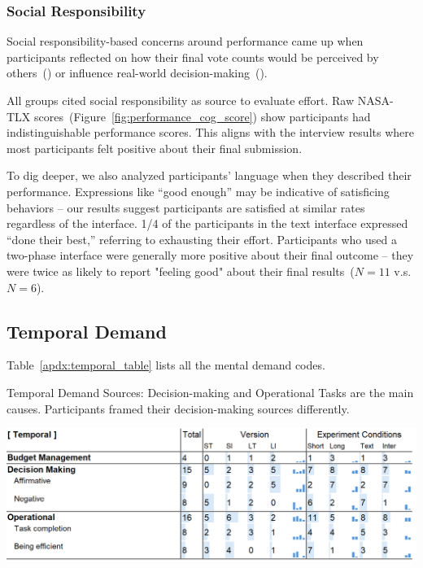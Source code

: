 \subsubsection{Social Responsibility}
Social responsibility-based concerns around performance came up when participants reflected on how their final vote counts would be perceived by others~() or influence real-world decision-making~().

All groups cited social responsibility as source to evaluate effort. Raw NASA-TLX scores~(Figure~\ref{fig:performance_cog_score}) show participants had indistinguishable performance scores. This aligns with the interview results where most participants felt positive about their final submission. 

To dig deeper, we also analyzed participants' language when they described their performance. Expressions like ``good enough'' may be indicative of satisficing behaviors -- our results suggest participants are satisfied at similar rates regardless of the interface. 1/4 of the participants in the text interface expressed ``done their best,'' referring to exhausting their effort. Participants who used a two-phase interface were generally more positive about their final outcome -- they were twice as likely to report "feeling good" about their final results~($N=11$ v.s. $N=6$).


\subsection{Temporal Demand}
Table~\ref{apdx:temporal_table} lists all the mental demand codes.
\label{apdx:temporal_table}
\begin{table}[ht]
    \caption{Temporal Demand Sources: Decision-making and Operational Tasks are the main causes. Participants framed their decision-making sources differently.}

    \label{tbl:temporal}
    \includegraphics[width=\linewidth]{content/image/cog/temporal_table.png}
\end{table}

